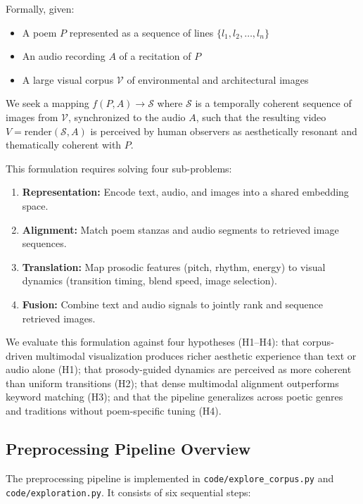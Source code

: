 \documentclass[11pt,a4paper]{article}
\begin{document}
\noindent Formally, given:
\begin{itemize}
  \item A poem $P$ represented as a sequence of lines $\{l_1, l_2, \ldots, l_n\}$
  \item An audio recording $A$ of a recitation of $P$
  \item A large visual corpus $\mathcal{V}$ of environmental and architectural images
\end{itemize}
We seek a mapping $f(P, A) \rightarrow \mathcal{S}$ where $\mathcal{S}$ is a temporally coherent sequence of images from $\mathcal{V}$, synchronized to the audio $A$, such that the resulting video $V = \text{render}(\mathcal{S}, A)$ is perceived by human observers as aesthetically resonant and thematically coherent with $P$.

\noindent This formulation requires solving four sub-problems:
\begin{enumerate}
  \item \textbf{Representation:} Encode text, audio, and images into a shared embedding space.
  \item \textbf{Alignment:} Match poem stanzas and audio segments to retrieved image sequences.
  \item \textbf{Translation:} Map prosodic features (pitch, rhythm, energy) to visual dynamics (transition timing, blend speed, image selection).
  \item \textbf{Fusion:} Combine text and audio signals to jointly rank and sequence retrieved images.
\end{enumerate}

\noindent We evaluate this formulation against four hypotheses (H1--H4): that corpus-driven multimodal visualization produces richer aesthetic experience than text or audio alone (H1); that prosody-guided dynamics are perceived as more coherent than uniform transitions (H2); that dense multimodal alignment outperforms keyword matching (H3); and that the pipeline generalizes across poetic genres and traditions without poem-specific tuning (H4).

\subsection*{Preprocessing Pipeline Overview}

The preprocessing pipeline is implemented in \texttt{code/explore\_corpus.py} and \texttt{code/exploration.py}. It consists of six sequential steps:
\end{document}
